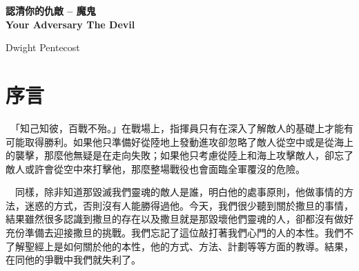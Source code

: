 \documentclass{book}
\author{
    Editor, Michael Chan\\
        \texttt{chchan@link.cuhk.edu.hk}
}
\begin{document}
\clearpage
\newcommand\nbvspace[1][3]{\vspace*{\stretch{#1}}}
\newcommand\nbstretchyspace{\spaceskip0.5em plus 0.25em minus 0.25em}
\newcommand{\nbtitlestretch}{\spaceskip0.6em}
\pagestyle{empty}
\begin{center}
\bfseries
\nbvspace[1]
\Huge
{%
    \huge
        \textbf{認清你的仇敵 -- 魔鬼\\Your Adversary The Devil}}

        \nbvspace[1]

{\large
    Dwight Pentecost
}

\nbvspace[1]




        \end{center}

        \newpage

        \setcounter{tocdepth}{0}
        \dominitoc
        \Large
        \tableofcontents

        \Large

        \chapter*{序言}
        \label{subsec:prolog}
        　「知己知彼，百戰不殆。」在戰場上，指揮員只有在深入了解敵人的基礎上才能有可能取得勝利。如果他只準備好從陸地上發動進攻卻忽略了敵人從空中或是從海上的襲擊，那麼他無疑是在走向失敗；如果他只考慮從陸上和海上攻擊敵人，卻忘了敵人或許會從空中來打擊他，那麼整場戰役也會面臨全軍覆沒的危險。

        　同樣，除非知道那毀滅我們靈魂的敵人是誰，明白他的處事原則，他做事情的方法，迷惑的方式，否則沒有人能勝得過他。今天，我們很少聽到關於撒旦的事情，結果雖然很多認識到撒旦的存在以及撒旦就是那毀壞他們靈魂的人，卻都沒有做好充份準備去迎接撒旦的挑戰。我們忘記了這位敲打著我們心門的人的本性。我們不了解聖經上是如何關於他的本性，他的方式、方法、計劃等等方面的教導。結果，在同他的爭戰中我們就失利了。
\end{document}
